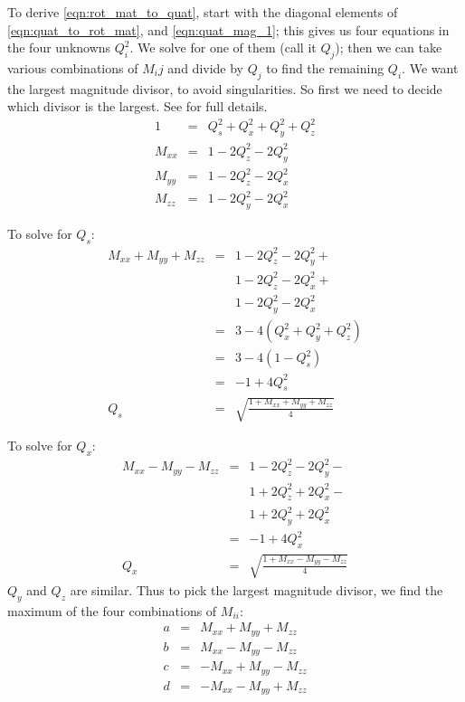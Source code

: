 \documentclass{book}
\numberwithin{equation}{subsection}
\begin{document}
To derive \ref{eqn:rot_mat_to_quat}, start with the diagonal
elements of \ref{eqn:quat_to_rot_mat}, and \ref{eqn:quat_mag_1};
this gives us four equations in the four unknowns $Q_i^2$. We solve
for one of them (call it $Q_j$); then we can take various combinations
of $M_ij$ and divide by $Q_j$ to find the remaining $Q_i$. We want the
largest magnitude divisor, to avoid singularities. So first we need to
decide which divisor is the largest. See
 for full details.
\begin{eqnarray}
1 &=& Q_s^2 + Q_x^2 + Q_y^2 + Q_z^2 \nonumber\\
M_{xx} & =& 1 - 2 Q_z^2 - 2 Q_y^2 \nonumber\\
M_{yy} & =& 1 - 2 Q_z^2 - 2 Q_x^2 \nonumber\\
M_{zz} & =& 1 - 2 Q_y^2 - 2 Q_x^2
\end{eqnarray}

To solve for $Q_s$:
\begin{eqnarray}
M_{xx} + M_{yy} + M_{zz} & = & 1 - 2 Q_z^2 - 2 Q_y^2 + \nonumber       \\
                         &   & 1 - 2 Q_z^2 - 2 Q_x^2 + \nonumber       \\
                         &   & 1 - 2 Q_y^2 - 2 Q_x^2 \nonumber         \\ 
                         & = & 3 - 4 (Q_x^2 + Q_y^2 + Q_z^2) \nonumber \\
                         & = & 3 - 4 (1 - Q_s^2) \nonumber             \\
                         & = & - 1 + 4 Q_s^2 \nonumber                 \\
Q_s                      & = & \sqrt{\frac{1 + M_{xx} + M_{yy} + M_{zz}}{4}}
\end{eqnarray}

To solve for $Q_x$:
\begin{eqnarray}
M_{xx} - M_{yy} - M_{zz} & = & 1 - 2 Q_z^2 - 2 Q_y^2 - \nonumber    \\
                         &   & 1 + 2 Q_z^2 + 2 Q_x^2 - \nonumber    \\
                         &   & 1 + 2 Q_y^2 + 2 Q_x^2 \nonumber      \\ 
                         & = & -1 + 4 Q_x^2 \nonumber               \\ 
Q_x                      & = & \sqrt{\frac{1 + M_{xx} - M_{yy} - M_{zz}}{4}}
\end{eqnarray}
$Q_y$ and $Q_z$ are similar. Thus to pick the largest magnitude
divisor, we find the maximum of the four combinations of $M_{ii}$:
\begin{eqnarray}
a                        & = & M_{xx} + M_{yy} + M_{zz} \nonumber   \\
b                        & = & M_{xx} - M_{yy} - M_{zz} \nonumber   \\
c                        & = & - M_{xx} + M_{yy} - M_{zz} \nonumber \\
d                        & = & - M_{xx} - M_{yy} + M_{zz} 
\end{eqnarray}
\end{document}
